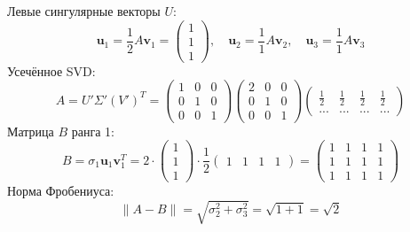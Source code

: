 \documentclass[a4paper]{article}
\begin{document}
\begin{enumerate}
\begin{enumerate}
  Левые сингулярные векторы \( U \):  
  \[
  \mathbf{u}_1 = \frac{1}{2} A \mathbf{v}_1 = 
  \begin{pmatrix} 1 \\ 1 \\ 1 \end{pmatrix}, \quad \mathbf{u}_2 =
   \frac{1}{1} A \mathbf{v}_2, \quad \mathbf{u}_3 = \frac{1}{1} A \mathbf{v}_3
  \]
  Усечённое SVD:
  \[
  A = U' \Sigma' (V')^T = \begin{pmatrix}
  1 & 0 & 0 \\
  0 & 1 & 0 \\
  0 & 0 & 1
  \end{pmatrix} \begin{pmatrix}
  2 & 0 & 0 \\
  0 & 1 & 0 \\
  0 & 0 & 1
  \end{pmatrix} \begin{pmatrix}
  \frac{1}{2} & \frac{1}{2} & \frac{1}{2} & \frac{1}{2} \\
  \text{...} & \text{...} & \text{...} & \text{...}
  \end{pmatrix}
  \]
  Матрица \( B \) ранга 1:
  \[
  B = \sigma_1 \mathbf{u}_1 \mathbf{v}_1^T = 2 \cdot
   \begin{pmatrix} 1 \\ 1 \\ 1 \end{pmatrix} \cdot \frac{1}{2}
    \begin{pmatrix} 1 & 1 & 1 & 1 \end{pmatrix} = \begin{pmatrix}
  1 & 1 & 1 & 1 \\
  1 & 1 & 1 & 1 \\
  1 & 1 & 1 & 1
  \end{pmatrix}
  \]  
  Норма Фробениуса:  
  \[
  \|A - B\| = \sqrt{\sigma_2^2 + \sigma_3^2} = \sqrt{1 + 1} = \sqrt{2}
  \]
  \end{enumerate}
\end{enumerate}
\end{document}
